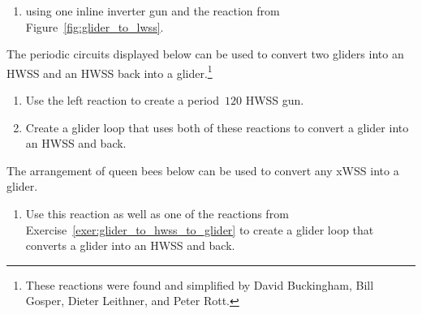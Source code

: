 \begin{multicols}{2}
\begin{problem}
\begin{enumerate}[label=\bf\color{ocre}(\alph*)]
			\item using one inline inverter gun and the reaction from Figure~\ref{fig:glider_to_lwss}.
		\end{enumerate}
	\end{problem}
	
	
	\mfilbreak
	
	
	\begin{problem}\label{exer:glider_to_hwss_to_glider}
		The periodic circuits displayed below can be used to convert two gliders into an HWSS and an HWSS back into a glider.\footnote{These reactions were found and simplified by David Buckingham, Bill Gosper, Dieter Leithner, and Peter Rott.}
		\begin{center}
		\end{center}
		\begin{enumerate}[label=\bf\color{ocre}(\alph*)]
			\item {} Use the left reaction to create a period~$120$ HWSS gun.
			
			\item {} Create a glider loop that uses both of these reactions to convert a glider into an HWSS and back.
		\end{enumerate}
	\end{problem}
	
	
	\mfilbreak
	
	
	\begin{problem}\label{exer:any_wss_to_glider}
		The arrangement of queen bees below can be used to convert any xWSS into a glider.
		\begin{center}
		\end{center}
		\begin{enumerate}[label=\bf\color{ocre}(\alph*)]
			\item {} Use this reaction as well as one of the reactions from Exercise~\ref{exer:glider_to_hwss_to_glider} to create a glider loop that converts a glider into an HWSS and back.
			

\end{enumerate}
\end{problem}
\end{multicols}
